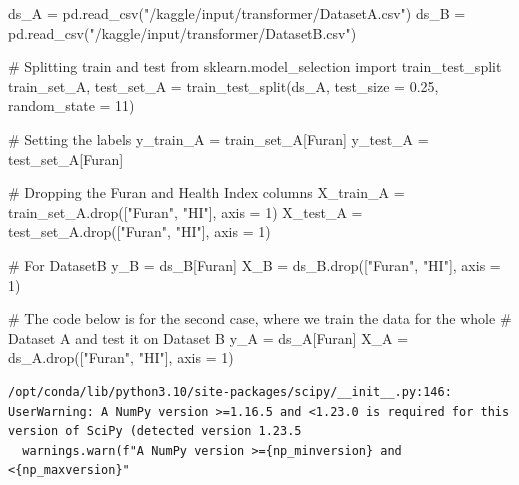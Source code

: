 \documentclass[
  letterpaper,
  DIV=11,
  numbers=noendperiod]{scrartcl}
\newenvironment{Shaded}{\begin{snugshade}}{\end{snugshade}}
\newcommand{\CommentTok}[1]{\textcolor[rgb]{0.37,0.37,0.37}{#1}}
\newcommand{\DecValTok}[1]{\textcolor[rgb]{0.68,0.00,0.00}{#1}}
\newcommand{\FloatTok}[1]{\textcolor[rgb]{0.68,0.00,0.00}{#1}}
\newcommand{\ImportTok}[1]{\textcolor[rgb]{0.00,0.46,0.62}{#1}}
\newcommand{\NormalTok}[1]{\textcolor[rgb]{0.00,0.23,0.31}{#1}}
\newcommand{\OperatorTok}[1]{\textcolor[rgb]{0.37,0.37,0.37}{#1}}
\newcommand{\StringTok}[1]{\textcolor[rgb]{0.13,0.47,0.30}{#1}}
\begin{document}
\begin{Shaded}
\begin{Highlighting}[]
\NormalTok{ds\_A }\OperatorTok{=}\NormalTok{ pd.read\_csv(}\StringTok{"/kaggle/input/transformer/DatasetA.csv"}\NormalTok{)}
\NormalTok{ds\_B }\OperatorTok{=}\NormalTok{ pd.read\_csv(}\StringTok{"/kaggle/input/transformer/DatasetB.csv"}\NormalTok{)}

\CommentTok{\# Splitting train and test}
\ImportTok{from}\NormalTok{ sklearn.model\_selection }\ImportTok{import}\NormalTok{ train\_test\_split}
\NormalTok{train\_set\_A, test\_set\_A }\OperatorTok{=}\NormalTok{ train\_test\_split(ds\_A, test\_size }\OperatorTok{=} \FloatTok{0.25}\NormalTok{, random\_state }\OperatorTok{=} \DecValTok{11}\NormalTok{)}

\CommentTok{\# Setting the labels}
\NormalTok{y\_train\_A }\OperatorTok{=}\NormalTok{ train\_set\_A[}\StringTok{\textquotesingle{}Furan\textquotesingle{}}\NormalTok{]}
\NormalTok{y\_test\_A }\OperatorTok{=}\NormalTok{ test\_set\_A[}\StringTok{\textquotesingle{}Furan\textquotesingle{}}\NormalTok{]}

\CommentTok{\# Dropping the Furan and Health Index columns}
\NormalTok{X\_train\_A }\OperatorTok{=}\NormalTok{ train\_set\_A.drop([}\StringTok{"Furan"}\NormalTok{, }\StringTok{"HI"}\NormalTok{], axis }\OperatorTok{=} \DecValTok{1}\NormalTok{)}
\NormalTok{X\_test\_A }\OperatorTok{=}\NormalTok{ test\_set\_A.drop([}\StringTok{"Furan"}\NormalTok{, }\StringTok{"HI"}\NormalTok{], axis }\OperatorTok{=} \DecValTok{1}\NormalTok{)}

\CommentTok{\# For DatasetB}
\NormalTok{y\_B }\OperatorTok{=}\NormalTok{ ds\_B[}\StringTok{\textquotesingle{}Furan\textquotesingle{}}\NormalTok{]}
\NormalTok{X\_B }\OperatorTok{=}\NormalTok{ ds\_B.drop([}\StringTok{"Furan"}\NormalTok{, }\StringTok{"HI"}\NormalTok{], axis }\OperatorTok{=} \DecValTok{1}\NormalTok{)}

\CommentTok{\# The code below is for the second case, where we train the data for the whole}
\CommentTok{\# Dataset A and test it on Dataset B}
\NormalTok{y\_A }\OperatorTok{=}\NormalTok{ ds\_A[}\StringTok{\textquotesingle{}Furan\textquotesingle{}}\NormalTok{]}
\NormalTok{X\_A }\OperatorTok{=}\NormalTok{ ds\_A.drop([}\StringTok{"Furan"}\NormalTok{, }\StringTok{"HI"}\NormalTok{], axis }\OperatorTok{=} \DecValTok{1}\NormalTok{)}
\end{Highlighting}
\end{Shaded}

\begin{verbatim}
/opt/conda/lib/python3.10/site-packages/scipy/__init__.py:146: UserWarning: A NumPy version >=1.16.5 and <1.23.0 is required for this version of SciPy (detected version 1.23.5
  warnings.warn(f"A NumPy version >={np_minversion} and <{np_maxversion}"
\end{verbatim}
\end{document}
